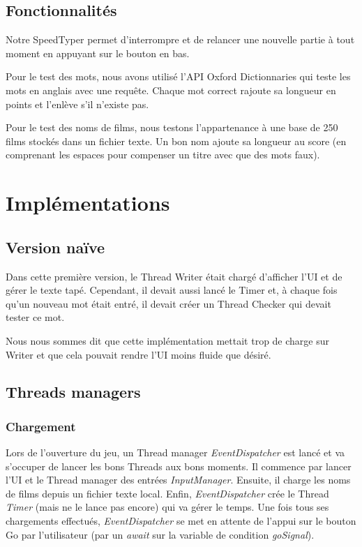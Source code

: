 \documentclass[a4paper,11pt]{article}
\begin{document}
\subsection{Fonctionnalités}
Notre SpeedTyper permet d'interrompre et de relancer une nouvelle partie à tout moment en appuyant sur le bouton en bas.\par
Pour le test des mots, nous avons utilisé l'API Oxford Dictionnaries qui teste les mots en anglais avec une requête. Chaque mot correct rajoute sa longueur en points et l'enlève s'il n'existe pas.\par
Pour le test des noms de films, nous testons l'appartenance à une base de 250 films stockés dans un fichier texte. Un bon nom ajoute sa longueur au score (en comprenant les espaces pour compenser un titre avec que des mots faux).\par

\section{Implémentations}
\subsection{Version naïve}
Dans cette première version, le Thread Writer était chargé d'afficher l'UI et de gérer le texte tapé. Cependant, il devait aussi lancé le Timer et, à chaque fois qu'un nouveau mot était entré, il devait créer un Thread Checker qui devait tester ce mot.\par
Nous nous sommes dit que cette implémentation mettait trop de charge sur Writer et que cela pouvait rendre l'UI moins fluide que désiré.\par

\subsection{Threads managers}
\subsubsection{Chargement}
Lors de l'ouverture du jeu, un Thread manager \textit{EventDispatcher} est lancé et va s'occuper de lancer les bons Threads aux bons moments. Il commence par lancer l'UI et le Thread manager des entrées \textit{InputManager}. Ensuite, il charge les noms de films depuis un fichier texte local. Enfin, \textit{EventDispatcher} crée le Thread \textit{Timer} (mais ne le lance pas encore) qui va gérer le temps. Une fois tous ses chargements effectués, \textit{EventDispatcher} se met en attente de l'appui sur le bouton Go par l'utilisateur (par un \textit{await} sur la variable de condition \textit{goSignal}).\par
\end{document}

